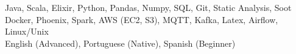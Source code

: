 \documentclass[letter,11pt]{article}
\begin{document}
 \hfill   Java, Scala, Elixir, Python, Pandas, Numpy, SQL, Git, Static Analysis, Soot  \\  
 \hfill    Docker, Phoenix, Spark, AWS (EC2, S3), MQTT, Kafka, Latex, Airflow, Linux/Unix \\
 \hfill          English (Advanced), Portuguese (Native), Spanish (Beginner)
\end{document}

